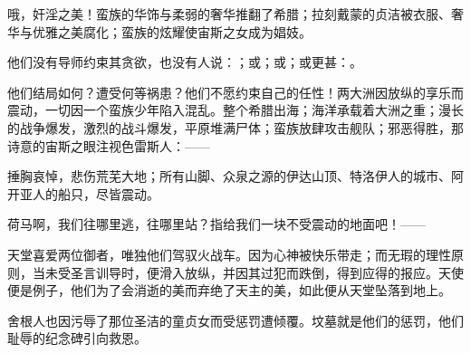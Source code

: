\par

哦，奸淫之美！蛮族的华饰与柔弱的奢华推翻了希腊；拉刻戴蒙的贞洁被衣服、奢华与优雅之美腐化；蛮族的炫耀使宙斯之女成为娼妓。\par

他们没有导师约束其贪欲，也没有人说：；或；或；或更甚：。\par

他们结局如何？遭受何等祸患？他们不愿约束自己的任性！两大洲因放纵的享乐而震动，一切因一个蛮族少年陷入混乱。整个希腊出海；海洋承载着大洲之重；漫长的战争爆发，激烈的战斗爆发，平原堆满尸体；蛮族放肆攻击舰队；邪恶得胜，那诗意的宙斯之眼注视色雷斯人：——\par

\par

捶胸哀悼，悲伤荒芜大地；所有山脚、众泉之源的伊达山顶、特洛伊人的城市、阿开亚人的船只，尽皆震动。\par

荷马啊，我们往哪里逃，往哪里站？指给我们一块不受震动的地面吧！——\par

\par

天堂喜爱两位御者，唯独他们驾驭火战车。因为心神被快乐带走；而无瑕的理性原则，当未受圣言训导时，便滑入放纵，并因其过犯而跌倒，得到应得的报应。天使便是例子，他们为了会消逝的美而弃绝了天主的美，如此便从天堂坠落到地上。\par

舍根人也因污辱了那位圣洁的童贞女而受惩罚遭倾覆。坟墓就是他们的惩罚，他们耻辱的纪念碑引向救恩。\par


